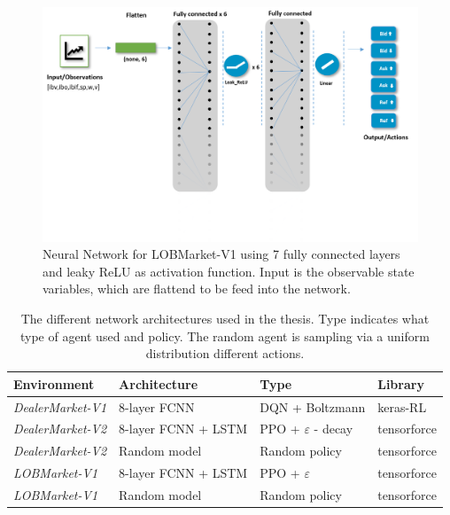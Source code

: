 \documentclass{kththesis}
\theoremstyle{definition}
\begin{document}
\begin{figure}[H]
    \centering
    \includegraphics[scale=.5]{Imgs/nna1.png}
    \caption{Neural Network for LOBMarket-V1 using 7 fully connected layers and leaky ReLU as activation function. Input is the observable state variables, which are flattend to be feed into the network.}
    \label{fig:e4}
\end{figure}

\begin{table}[H]
\centering
\caption{The different network architectures used in the thesis. Type indicates what type of agent used and policy. The random agent is sampling via a uniform distribution different actions.}
\label{tab:e1}
\begin{tabular}{llll}
 \textbf{Environment} & \textbf{Architecture}  & \textbf{Type}  & \textbf{Library}  \\ \hline
 \textit{DealerMarket-V1}& 8-layer FCNN  & DQN + Boltzmann  & keras-RL   \\
 \textit{DealerMarket-V2}& 8-layer FCNN + LSTM  & PPO + $\varepsilon$ - decay  & tensorforce  \\
 \textit{DealerMarket-V2} & Random model  & Random policy  & tensorforce \\
 \textit{LOBMarket-V1} & 8-layer FCNN + LSTM  & PPO + $\varepsilon$  & tensorforce \\ 
 \textit{LOBMarket-V1} & Random model  & Random policy  & tensorforce
\end{tabular}
\end{table}
\end{document}

